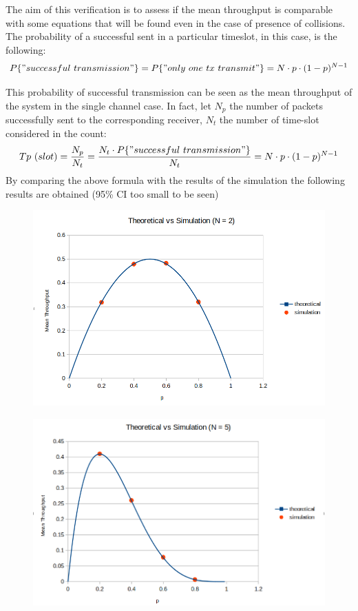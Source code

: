 \noindent The aim of this verification is to assess if the mean throughput is comparable with some equations that will be found even in the case of presence of collisions. \\


\noindent The probability of a successful sent in a particular timeslot, in this case, is the following:
\begin{equation}
	P\{" successful\ transmission"\} = P\{"only\ one\ tx\ transmit"\} = N\cdot p \cdot(1-p)^{N-1}
\end{equation}

This probability of successful transmission can be seen as the mean throughput of the system in the single channel case. In fact, let $N_{p}$ the number of packets successfully sent to the corresponding receiver, $N_{t}$ the number of time-slot considered in the count:
\begin{align*}
Tp\ (slot) = \frac{N_{p}}{N_{t}} = \frac{N_{t}\cdot P\{"successful\ transmission"\}}{N_{t}} = N\cdot p\cdot (1-p)^{N-1}
\end{align*}
By comparing the above formula with the results of the simulation the following results are obtained (95\% CI too small to be seen)
\begin{figure}[H]
	\centering
	\includegraphics[width=\textwidth]{img/SecondVerificationN2.png}
\end{figure}
\begin{figure}[H]
	\centering
	\includegraphics[width=\textwidth]{img/SecondVerificationN5.png}
\end{figure}
